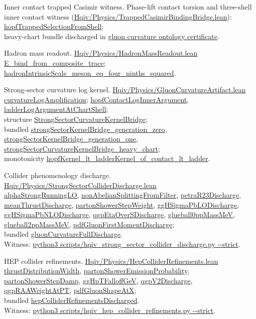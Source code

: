 \documentclass[11pt]{amsart}
\newcommand{\leanrepo}{https://github.com/HQIV/hqiv-lean/blob/main}
\newcommand{\leanfile}[1]{\href{\leanrepo/#1}{\footnotesize\url{#1}}}
\newcommand{\leanid}[1]{{\footnotesize\ttfamily\url{#1}}}
\newenvironment{leanindex}{%
  \begin{description}[style=nextline,leftmargin=0pt,labelindent=0pt,
    labelsep=0.5em,itemsep=0.75\baselineskip]%
  \footnotesize\raggedright\sloppy
}{%
  \end{description}%
}
\begin{document}
\begin{leanindex}
\item[\phantomsection\label{lean:inner-contact-witness}Inner contact trapped Casimir witness.]
  Phase-lift contact torsion and three-shell inner contact witness
  (\leanfile{Hqiv/Physics/TrappedCasimirBindingBridge.lean}):\\
  \leanid{hopfTrappedSelectionFromShell};\\
  heavy-chart bundle discharged in
  \hyperref[lean:gluon-closure]{gluon curvature ontology certificate}.

\item[\phantomsection\label{lean:hadron-readout}Hadron mass readout.]
  \leanfile{Hqiv/Physics/HadronMassReadout.lean}\\
  \leanid{E_bind_from_composite_trace};
  \leanid{hadronIntrinsicScale_meson_eq_four_ninths_squared}.

\item[\phantomsection\label{lean:kernel-bridge}Strong-sector curvature log kernel.]
  \leanfile{Hqiv/Physics/GluonCurvatureArtifact.lean}\\
  \leanid{curvatureLogAmplification};
  \leanid{hopfContactLogInnerArgument}, \leanid{ladderLogArgumentAtChartShell};\\
  structure \leanid{StrongSectorCurvatureKernelBridge};\\
  bundled \leanid{strongSectorKernelBridge_generation_zero},
  \leanid{strongSectorKernelBridge_generation_one},
  \leanid{strongSectorCurvatureKernelBridge_heavy_chart};\\
  monotonicity \leanid{hopfKernel_lt_ladderKernel_of_contact_lt_ladder}.

\item[\phantomsection\label{lean:collider-discharge}Collider phenomenology discharge.]
  \leanfile{Hqiv/Physics/StrongSectorColliderDischarge.lean}\\
  \leanid{alphaStrongRunningLO}, \leanid{nonAbelianSplittingFromFilter},
  \leanid{petraR23Discharge}, \leanid{meanThrustDischarge},
  \leanid{partonShowerStepWeight}, \leanid{ggHSigmaPbLODischarge},
  \leanid{ggHSigmaPbNLODischarge}, \leanid{qgpEtaOverSDischarge},
  \leanid{glueball0ppMassMeV}, \leanid{glueball2ppMassMeV},
  \leanid{pdfGluonFirstMomentDischarge};\\
  bundled \leanid{gluonCurvatureFullDischarge}.\\
  Witness: \leanid{python3 scripts/hqiv_strong_sector_collider_discharge.py --strict}.

\item[\phantomsection\label{lean:hep-refinements}HEP collider refinements.]
  \leanfile{Hqiv/Physics/HepColliderRefinements.lean}\\
  \leanid{thrustDistributionWidth}, \leanid{partonShowerEmissionProbability},
  \leanid{partonShowerStepDamp}, \leanid{ggHpTFalloffGeV},
  \leanid{qgpV2Discharge}, \leanid{qgpRAAWeightAtPT}, \leanid{pdfGluonShapeAtX};\\
  bundled \leanid{hepColliderRefinementsDischarged}.\\
  Witness: \leanid{python3 scripts/hqiv_hep_collider_refinements.py --strict}.


\end{leanindex}
\end{document}
